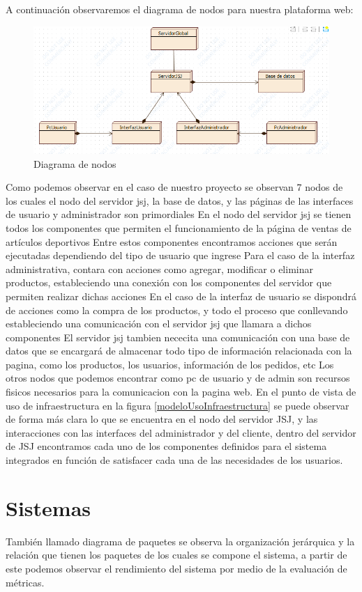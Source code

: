 A continuación observaremos el diagrama de nodos para nuestra plataforma web:

\begin{figure}[h]
	\centering
	\includegraphics[width=0.7\linewidth]{arquitectura/imagenes/DiagramaNodos}
	\caption{Diagrama de nodos}
	\label{fig:diagramanodos}
\end{figure}

Como podemos observar en el caso de nuestro proyecto se observan 7 nodos de los cuales el nodo del servidor jsj, la base de datos, y las páginas de las interfaces de usuario y administrador son primordiales
En el nodo del servidor jsj se tienen todos los componentes que permiten el funcionamiento de la página de ventas de artículos deportivos
Entre estos componentes encontramos acciones que serán ejecutadas dependiendo del tipo de usuario que ingrese
Para el caso de la interfaz administrativa, contara con acciones como agregar, modificar o eliminar productos, estableciendo una conexión con los componentes del servidor que permiten realizar dichas acciones
En el caso de la interfaz de usuario se dispondrá de acciones como la compra de los productos, y todo el proceso que conllevando estableciendo una comunicación con el servidor jsj que llamara a dichos componentes
El servidor jsj tambien nececita una comunicación con una base de datos que se encargará de almacenar todo tipo de información relacionada con la pagina, como los productos, los usuarios, información de los pedidos, etc
Los otros nodos que podemos encontrar como pc de usuario y de admin son recursos fisicos necesarios para la comunicacion con la pagina web. \newline
En el punto de vista de uso de infraestructura en la figura \ref{modeloUsoInfraestructura} se puede observar de forma más clara lo que se encuentra en el nodo del servidor JSJ, y las interacciones con las interfaces del administrador y del cliente, dentro del servidor de JSJ encontramos cada uno de los componentes definidos para el sistema integrados en función de satisfacer cada una de las necesidades de los usuarios.
\newpage

\section{Sistemas}
También llamado diagrama de paquetes se observa la organización jerárquica y la relación que tienen los paquetes de los cuales se compone el sistema, a partir de este podemos observar el rendimiento del sistema por medio de la evaluación de métricas.

